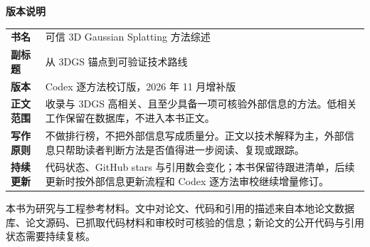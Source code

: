 \clearpage
\thispagestyle{empty}
\vspace*{0.16\textheight}

{\Large\bfseries 版本说明}\\[1.2cm]

\noindent\begin{tabularx}{\textwidth}{@{}p{3.2cm}X@{}}
\textbf{书名} & 可信 3D Gaussian Splatting 方法综述 \\
\textbf{副标题} & 从 3DGS 锚点到可验证技术路线 \\
\textbf{版本} & Codex 逐方法校订版，2026 年 11 月增补版 \\
\textbf{正文范围} & 收录与 3DGS 高相关、且至少具备一项可核验外部信息的方法。低相关工作保留在数据库，不进入本书正文。 \\
\textbf{写作原则} & 不做排行榜，不把外部信息写成质量分。正文以技术解释为主，外部信息只帮助读者判断方法是否值得进一步阅读、复现或跟踪。 \\
\textbf{持续更新} & 代码状态、GitHub stars 与引用数会变化；本书保留待跟进清单，后续更新时按外部信息更新流程和 Codex 逐方法审校继续增量修订。 \\
\end{tabularx}

\vfill
{\small\color{techgray}
本书为研究与工程参考材料。文中对论文、代码和引用的描述来自本地论文数据库、论文源码、已抓取代码材料和审校时可核验的信息；新论文的公开代码与引用状态需要持续复核。}

\clearpage
